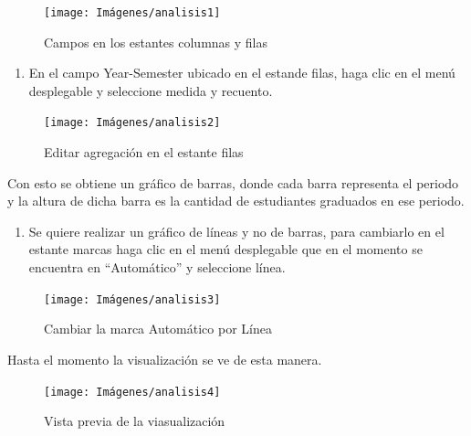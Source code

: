 \documentclass[
]{book}
\providecommand{\tightlist}{%
  \setlength{\itemsep}{0pt}\setlength{\parskip}{0pt}}
\begin{document}
\begin{figure}

{\centering \texttt{[image: Imágenes/analisis1]} 

}

\caption{Campos en los estantes columnas y filas}\label{fig:paso1lineas-fig}
\end{figure}

\begin{enumerate}
\def\labelenumi{\arabic{enumi}.}
\setcounter{enumi}{1}
\tightlist
\item
  En el campo Year-Semester ubicado en el estande filas, haga clic en el menú desplegable y seleccione medida y recuento.
\end{enumerate}

\begin{figure}

{\centering \texttt{[image: Imágenes/analisis2]} 

}

\caption{Editar agregación en el estante filas}\label{fig:paso2lineas-fig}
\end{figure}

Con esto se obtiene un gráfico de barras, donde cada barra representa el periodo y la altura de dicha barra es la cantidad de estudiantes graduados en ese periodo.

\begin{enumerate}
\def\labelenumi{\arabic{enumi}.}
\setcounter{enumi}{2}
\tightlist
\item
  Se quiere realizar un gráfico de líneas y no de barras, para cambiarlo en el estante marcas haga clic en el menú desplegable que en el momento se encuentra en ``Automático'' y seleccione línea.
\end{enumerate}

\begin{figure}

{\centering \texttt{[image: Imágenes/analisis3]} 

}

\caption{Cambiar la marca Automático por Línea}\label{fig:paso3lineas-fig}
\end{figure}

Hasta el momento la visualización se ve de esta manera.

\begin{figure}

{\centering \texttt{[image: Imágenes/analisis4]} 

}

\caption{Vista previa de la viasualización}\label{fig:paso3-1lineas-fig}
\end{figure}
\end{document}
